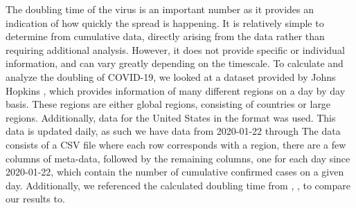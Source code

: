 The doubling time of the virus is an important number as it provides an indication of how quickly the spread is happening. It is relatively simple to determine from cumulative data, directly arising from the data rather than requiring additional analysis.
However, it does not provide specific or individual information, and can vary greatly depending on the timescale.
To calculate and analyze the doubling of COVID-19, we looked at a dataset provided by Johns Hopkins \cite{john_hopkins}, which provides information of many different regions on a day by day basis. 
These regions are either global regions, consisting of countries or large regions.
\if{}
Additionally, data for the United States in the format was used.
\fi
This data is updated daily, as such we have data from 2020-01-22 through 
The data consists of a CSV file where each row corresponds with a region, there are a few columns of meta-data, followed by the remaining columns, one for each day since 2020-01-22, which contain the number of cumulative confirmed cases on a given day.
Additionally, we referenced the calculated doubling time from \cite{systemic_review}, \cite{high_contagiousness}, to compare our results to.
